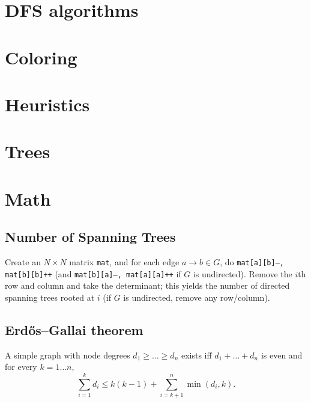 \section{DFS algorithms}

\section{Coloring}

\section{Heuristics}

\section{Trees}

\section{Math}
	\subsection{Number of Spanning Trees}
		Create an $N\times N$ matrix \texttt{mat}, and for each edge $a \rightarrow b \in G$, do
		\texttt{mat[a][b]--, mat[b][b]++} (and \texttt{mat[b][a]--, mat[a][a]++} if $G$ is undirected).
		Remove the $i$th row and column and take the determinant; this yields the number of directed spanning trees rooted at $i$
		(if $G$ is undirected, remove any row/column).

	\subsection{Erdős–Gallai theorem}
		A simple graph with node degrees $d_1 \ge \dots \ge d_n$ exists iff $d_1 + \dots + d_n$ is even and for every $k = 1\dots n$,
		\[ \sum _{i=1}^{k}d_{i}\leq k(k-1)+\sum _{i=k+1}^{n}\min(d_{i},k). \]
